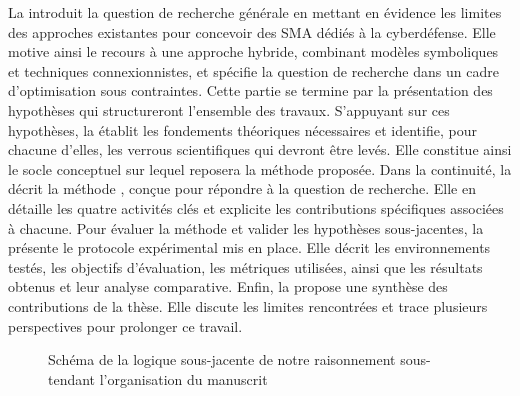 \noindent
La  introduit la question de recherche générale en mettant en évidence les limites des approches existantes pour concevoir des SMA dédiés à la cyberdéfense. Elle motive ainsi le recours à une approche hybride, combinant modèles symboliques et techniques connexionnistes, et spécifie la question de recherche dans un cadre d’optimisation sous contraintes. Cette partie se termine par la présentation des hypothèses qui structureront l’ensemble des travaux.
%
S’appuyant sur ces hypothèses, la  établit les fondements théoriques nécessaires et identifie, pour chacune d’elles, les verrous scientifiques qui devront être levés. Elle constitue ainsi le socle conceptuel sur lequel reposera la méthode proposée.
%
Dans la continuité, la  décrit la méthode , conçue pour répondre à la question de recherche. Elle en détaille les quatre activités clés et explicite les contributions spécifiques associées à chacune.
%
Pour évaluer la méthode et valider les hypothèses sous-jacentes, la  présente le protocole expérimental mis en place. Elle décrit les environnements testés, les objectifs d’évaluation, les métriques utilisées, ainsi que les résultats obtenus et leur analyse comparative.
%
Enfin, la  propose une synthèse des contributions de la thèse. Elle discute les limites rencontrées et trace plusieurs perspectives pour prolonger ce travail.
%
\begin{figure}[h!]
  \centering
  \resizebox{\textwidth}{!}{%
    
  }
  \caption{Schéma de la logique sous-jacente de notre raisonnement sous-tendant l'organisation du manuscrit}
  \label{fig:logique_manuscrit}
\end{figure}

\cleardoublepage
